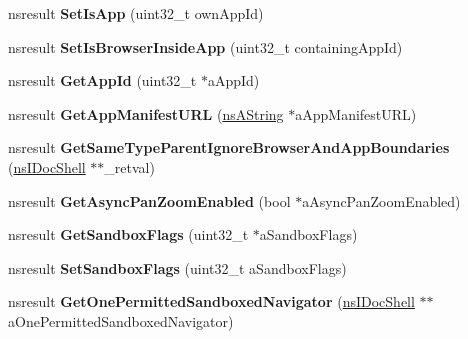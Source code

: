 \begin{DoxyCompactItemize}
nsresult {\bfseries Set\+Is\+App} (uint32\+\_\+t own\+App\+Id)
\item 
\mbox{\label{interfacens_i_doc_shell_ac13130ddfe6497768666bd7543907671}} 
nsresult {\bfseries Set\+Is\+Browser\+Inside\+App} (uint32\+\_\+t containing\+App\+Id)
\item 
\mbox{\label{interfacens_i_doc_shell_a9b49d3ac081b88ecb044c8050f15abe2}} 
nsresult {\bfseries Get\+App\+Id} (uint32\+\_\+t $\ast$a\+App\+Id)
\item 
\mbox{\label{interfacens_i_doc_shell_a70c1050c232b82e6115a44f0118308b3}} 
nsresult {\bfseries Get\+App\+Manifest\+U\+RL} (\hyperlink{structns_string_container}{ns\+A\+String} $\ast$a\+App\+Manifest\+U\+RL)
\item 
\mbox{\label{interfacens_i_doc_shell_a9d0f8e9783f8ccf6ff76e779939251ae}} 
nsresult {\bfseries Get\+Same\+Type\+Parent\+Ignore\+Browser\+And\+App\+Boundaries} (\hyperlink{interfacens_i_doc_shell}{ns\+I\+Doc\+Shell} $\ast$$\ast$\+\_\+retval)
\item 
\mbox{\label{interfacens_i_doc_shell_ac122bc1f9d49a380e2be6fa54066458f}} 
nsresult {\bfseries Get\+Async\+Pan\+Zoom\+Enabled} (bool $\ast$a\+Async\+Pan\+Zoom\+Enabled)
\item 
\mbox{\label{interfacens_i_doc_shell_a28c1f69e43f984a079a9d8f844656978}} 
nsresult {\bfseries Get\+Sandbox\+Flags} (uint32\+\_\+t $\ast$a\+Sandbox\+Flags)
\item 
\mbox{\label{interfacens_i_doc_shell_aaf05e1f590d09e2a4eb341cdb329b2a5}} 
nsresult {\bfseries Set\+Sandbox\+Flags} (uint32\+\_\+t a\+Sandbox\+Flags)
\item 
\mbox{\label{interfacens_i_doc_shell_a46814d4ae839199dc7244113875f0831}} 
nsresult {\bfseries Get\+One\+Permitted\+Sandboxed\+Navigator} (\hyperlink{interfacens_i_doc_shell}{ns\+I\+Doc\+Shell} $\ast$$\ast$a\+One\+Permitted\+Sandboxed\+Navigator)
\item 
\mbox{\label{interfacens_i_doc_shell_aff24c27d38861022747e0ecb139ebbc3}} 

\end{DoxyCompactItemize}
